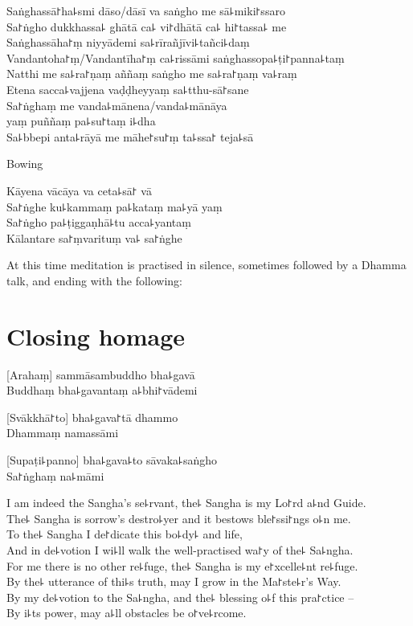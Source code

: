 \enlargethispage{\baselineskip}
\clearpage

Saṅghassā꜓ha꜕smi dāso/dāsī va saṅgho me sā꜕miki꜓ssaro\\%
Sa꜓ṅgho dukkhassa꜕ ghātā ca꜕ vi꜓dhātā ca꜕ hi꜓tassa꜕ me\\
Saṅghassāha꜓ṃ niyyādemi sa꜕rīrañjīvi꜕tañci꜕daṃ\\
Vandantoha꜓ṃ/Vandantīha꜓ṃ ca꜕rissāmi saṅghassopa꜕ṭi꜓panna꜕taṃ\\
Natthi me sa꜕ra꜓ṇaṃ aññaṃ saṅgho me sa꜕ra꜓ṇaṃ va꜕raṃ\\
Etena sacca꜕vajjena vaḍḍheyyaṃ sa꜕tthu-sā꜓sane\\
Sa꜓ṅghaṃ me vanda꜕mānena/vanda꜕mānāya\\
\vin yaṃ puññaṃ pa꜕su꜓taṃ i꜕dha\\
Sa꜕bbepi anta꜕rāyā me māhe꜓su꜓ṃ ta꜕ssa꜓ teja꜕sā

\begin{instruction}
  Bowing
\end{instruction}

Kāyena vācāya va ceta꜕sā꜓ vā\\
Sa꜓ṅghe ku꜕kammaṃ pa꜕kataṃ ma꜕yā yaṃ\\
Sa꜓ṅgho pa꜕ṭiggaṇhā꜕tu acca꜕yantaṃ\\
Kālantare sa꜓ṃvarituṃ va꜕ sa꜓ṅghe

\vfill

\begin{instruction}
  At this time meditation is practised in silence, sometimes followed by a Dhamma talk, and ending with the following:
\end{instruction}

\chapter{Closing homage}%

[Arahaṃ] sammāsambuddho bha꜕gavā\\
Buddhaṃ bha꜕gavantaṃ a꜕bhi꜓vādemi 

[Svākkhā꜓to] bha꜕gava꜓tā dhammo\\
Dhammaṃ namassāmi 

[Supaṭi꜕panno] bha꜕gava꜕to sāvaka꜕saṅgho\\
Sa꜓ṅghaṃ na꜕māmi 

\clearpage

I am indeed the Sangha's se꜕rvant, the꜕ Sangha is my Lo꜓rd a꜕nd Guide.\\%
The꜕ Sangha is sorrow's destro꜕yer and it bestows ble꜓ssi꜓ngs o꜕n me.\\
To the꜕ Sangha I de꜓dicate this bo꜕dy꜕ and life,\\
And in de꜕votion I wi꜕ll walk the well-practised wa꜓y of the꜕ Sa꜕ngha.\\
For me there is no other re꜕fuge, the꜕ Sangha is my e꜓xcelle꜕nt re꜕fuge.\\
By the꜕ utterance of thi꜕s truth, may I grow in the Ma꜓ste꜕r's Way.\\
By my de꜕votion to the Sa꜕ngha, and the꜕ blessing o꜕f this pra꜓ctice --\\
By i꜕ts power, may a꜕ll obstacles be o꜓ve꜕rcome.

